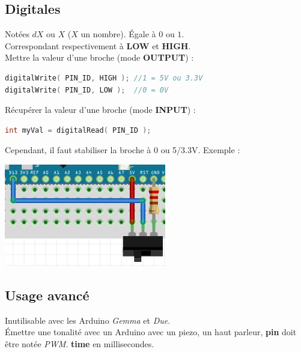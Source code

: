         \subsection{Digitales}

            \bmar
                Notées $dX$ ou $X$ ($X$ un nombre). Égale à $0$ ou $1$.\\
                Correspondant respectivement à \textbf{LOW} et \textbf{HIGH}.\\

                Mettre la valeur d'une broche (mode \textbf{OUTPUT}) :
            \emar

            \begin{lstlisting}[language=C]
digitalWrite( PIN_ID, HIGH ); //1 = 5V ou 3.3V
digitalWrite( PIN_ID, LOW );  //0 = 0V
            \end{lstlisting}

            \bmar
                Récupérer la valeur d'une broche (mode \textbf{INPUT}) :
            \emar

            \begin{lstlisting}[language=C]
int myVal = digitalRead( PIN_ID );
            \end{lstlisting}

            \bmar
                Cependant, il faut stabiliser la broche à 0 ou 5/3.3V. Exemple :
            \emar

            \begin{center}
                \includegraphics[scale=0.5]{img/arduino-1}
            \end{center}


        \subsection{Usage avancé}
            \bmar
                Inutilisable avec les Arduino \textit{Gemma} et \textit{Due}.\\
                Émettre une tonalité avec un Arduino avec un piezo, un haut parleur,
                \textbf{pin} doit être notée \textit{PWM}. \textbf{time} en millisecondes.
            \emar

